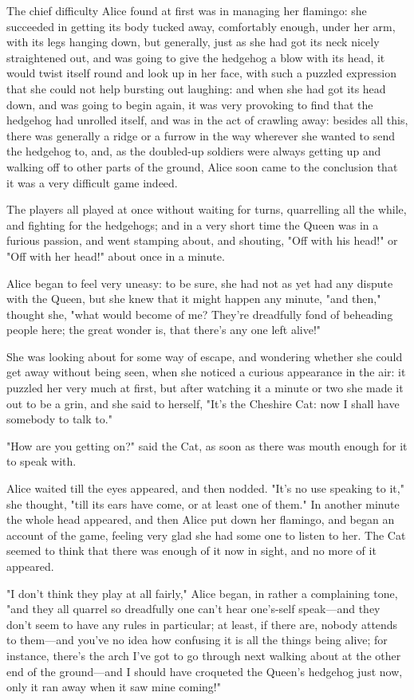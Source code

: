 The chief difficulty Alice found at first was in managing her flamingo: she succeeded in getting its body tucked away, comfortably enough, under her arm, with its legs hanging down, but generally, just as she had got its neck nicely straightened out, and was going to give the hedgehog a blow with its head, it would twist itself round and look up in her face, with such a puzzled ​expression that she could not help bursting out laughing: and when she had got its head down, and was going to begin again, it was very provoking to find that the hedgehog had unrolled itself, and was in the act of crawling away: besides all this, there was generally a ridge or a furrow in the way wherever she wanted to send the hedgehog to, and, as the doubled-up soldiers were always getting up and walking off to other parts of the ground, Alice soon came to the conclusion that it was a very difficult game indeed.

The players all played at once without waiting for turns, quarrelling all the while, and fighting for the hedgehogs; and in a very short time the Queen was in a furious passion, and went stamping about, and shouting, "Off with his head!" or "Off with her head!" about once in a minute.

Alice began to feel very uneasy: to be sure, she had not as yet had any dispute with the Queen, but she knew that it might happen any minute, "and then," thought she, "what would ​become of me? They're dreadfully fond of beheading people here; the great wonder is, that there's any one left alive!"

She was looking about for some way of escape, and wondering whether she could get away without being seen, when she noticed a curious appearance in the air: it puzzled her very much at first, but after watching it a minute or two she made it out to be a grin, and she said to herself, "It's the Cheshire Cat: now I shall have somebody to talk to."

"How are you getting on?" said the Cat, as soon as there was mouth enough for it to speak with.

Alice waited till the eyes appeared, and then nodded. "It's no use speaking to it," she thought, "till its ears have come, or at least one of them." In another minute the whole head appeared, and then Alice put down her flamingo, and began an account of the game, feeling very glad she had some one to listen to her. The Cat seemed to think that there was ​enough of it now in sight, and no more of it appeared.

"I don't think they play at all fairly," Alice began, in rather a complaining tone, "and they all quarrel so dreadfully one can't hear one's-self speak—and they don't seem to have any rules in particular; at least, if there are, nobody attends to them—and you've no idea how confusing it is all the things being alive; for instance, there's the arch I've got to go through next walking about at the other end of the ground—and I should have croqueted the Queen's hedgehog just now, only it ran away when it saw mine coming!"

